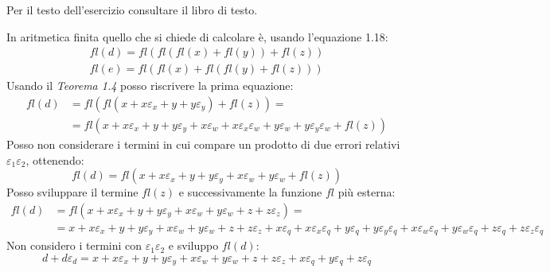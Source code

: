 \begin{exercise}[1.15]
Per il testo dell'esercizio consultare il libro di testo.
\end{exercise}
In aritmetica finita quello che si chiede di calcolare \`e, usando l'equazione 1.18:
\begin{displaymath}
\begin{split}
	fl(d) = fl(fl(fl(x) + fl(y)) + fl(z)) \\
	fl(e) = fl(fl(x) + fl(fl(y) + fl(z)))
\end{split}
\end{displaymath}
Usando il \emph{Teorema 1.4} posso riscrivere la prima equazione:
\begin{displaymath}
\begin{split}
	fl(d) &= fl(fl(x + x\varepsilon_{x} + y + y\varepsilon_{y}) + fl(z)) = \\
	  &=  fl(x + x\varepsilon_{x} + y + y\varepsilon_{y} + 
			x\varepsilon_{w} + x\varepsilon_{x}\varepsilon_{w} + 
			y\varepsilon_{w} + y\varepsilon_{y}\varepsilon_{w} + fl(z))
\end{split}
\end{displaymath}
Posso non considerare i termini in cui compare un prodotto di due errori relativi
$\varepsilon_{1} \varepsilon_{2}$, ottenendo:
\begin{displaymath}
	fl(d) = fl(x + x\varepsilon_{x} + y + y\varepsilon_{y} + 
			x\varepsilon_{w} +  y\varepsilon_{w} + fl(z))
\end{displaymath}
Posso sviluppare il termine $fl(z)$ e successivamente la funzione $fl$ pi\`u esterna:
\begin{displaymath}
\begin{split}
	fl(d) &= fl(x + x\varepsilon_{x} + y + y\varepsilon_{y} + 
			x\varepsilon_{w} +  y\varepsilon_{w} + z + z\varepsilon_{z}) = \\
	  &= x + x\varepsilon_{x} + y + y\varepsilon_{y} + 
			x\varepsilon_{w} +  y\varepsilon_{w} + z + z\varepsilon_{z} + 
		x\varepsilon_{q} + x\varepsilon_{x}\varepsilon_{q} + y\varepsilon_{q} + 
			y\varepsilon_{y}\varepsilon_{q} + 
			x\varepsilon_{w}\varepsilon_{q} +  y\varepsilon_{w}\varepsilon_{q} +
			 z\varepsilon_{q} + z\varepsilon_{z}\varepsilon_{q}
\end{split}
\end{displaymath}
Non considero i termini con $\varepsilon_{1} \varepsilon_{2}$ e sviluppo $fl(d)$:
\begin{displaymath}
	d + d\varepsilon_{d} = x + x\varepsilon_{x} + y + y\varepsilon_{y} + 
			x\varepsilon_{w} +  y\varepsilon_{w} + z + z\varepsilon_{z} + 
		x\varepsilon_{q} + y\varepsilon_{q} + 
			 z\varepsilon_{q}
\end{displaymath}
